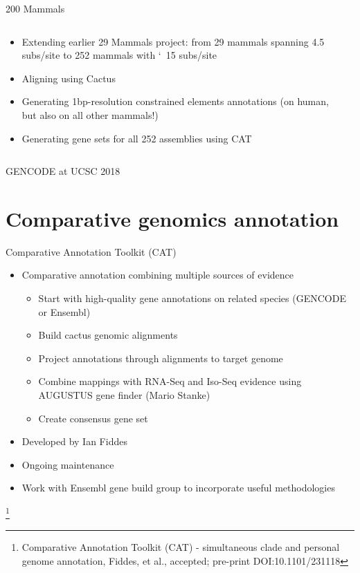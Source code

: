 \documentclass[10pt,
               hyperref={bookmarks=false,
                         bookmarksopen=false,
                         colorlinks=true,
                         linkcolor=blue,
                         urlcolor=blue},
               xcolor={svgnames,table}]{beamer}
\newcommand{\sectionframe}[1]{
  \begin{frame}{\thetitle}
    \section{#1}
  \end{frame}
}
\newcommand\blfootnote[1]{%
  \begingroup
  \renewcommand\thefootnote{}\footnote{#1}%
  \addtocounter{footnote}{-1}%
  \endgroup
}
\newenvironment{tightitemize}{%
\begin{itemize}
  \setlength{\itemsep}{1pt}%
  \setlength{\parskip}{0pt}%
  \setlength{\parsep}{0pt}%
}{\end{itemize}}
\newcommand{\thetitle}{GENCODE at UCSC 2018}
\begin{document}
\begin{frame}{200 Mammals}
  \begin{columns}
    \begin{column}{0.5\textwidth}
      \begin{itemize}
          \item Extending earlier 29 Mammals project: from 29 mammals spanning 4.5 subs/site to 252 mammals with \char`~15 subs/site
          \item Aligning using Cactus
          \item Generating 1bp-resolution constrained elements annotations (on human, but also on all other mammals!)
          \item Generating gene sets for all 252 assemblies using CAT
      \end{itemize}
    \end{column}
    \begin{column}{0.5\textwidth}
    \end{column}
  \end{columns}
\end{frame}

\sectionframe{Comparative genomics annotation}

\begin{frame}{Comparative Annotation Toolkit (CAT)}
  \begin{itemize}
  \item Comparative annotation combining multiple sources of evidence
    \begin{tightitemize}
    \item Start with high-quality gene annotations on related species (GENCODE or Ensembl)
    \item Build cactus genomic alignments
    \item Project annotations through alignments to target genome
    \item Combine mappings with RNA-Seq and Iso-Seq evidence using AUGUSTUS gene finder (Mario Stanke)
    \item Create consensus gene set 
    \end{tightitemize}
  \item Developed by Ian Fiddes
  \item Ongoing maintenance 
  \item Work with Ensembl gene build group to incorporate useful methodologies
  \end{itemize}
\blfootnote{Comparative Annotation Toolkit (CAT) - simultaneous clade and personal genome annotation, Fiddes, et al., accepted; pre-print DOI:10.1101/231118}
\end{frame}
\end{document}
